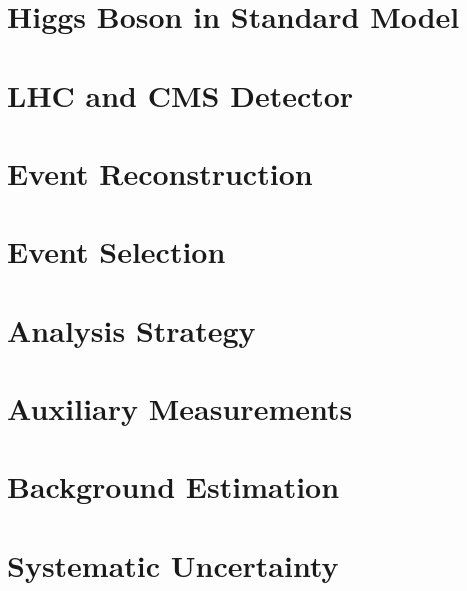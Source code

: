 \documentclass[12pt,chapterheads]{ucsd}
\begin{document}
%






%
\chapter{Higgs Boson in Standard Model}
\label{ch:intro_higgs}


%
\chapter{LHC and CMS Detector}
\label{ch:lhc_cms}


%
\chapter{Event Reconstruction}
\label{ch:event_reconstruction}


%
\chapter{Event Selection}
\label{ch:event_selection}


%
\chapter{Analysis Strategy}
\label{ch:analysis_strategy}


%
\chapter{Auxiliary Measurements}
\label{ch:auxiliary_measurement}


%
\chapter{Background Estimation}
\label{ch:background_estimation}


%
\chapter{Systematic Uncertainty}
\label{ch:systematics}

\end{document}
